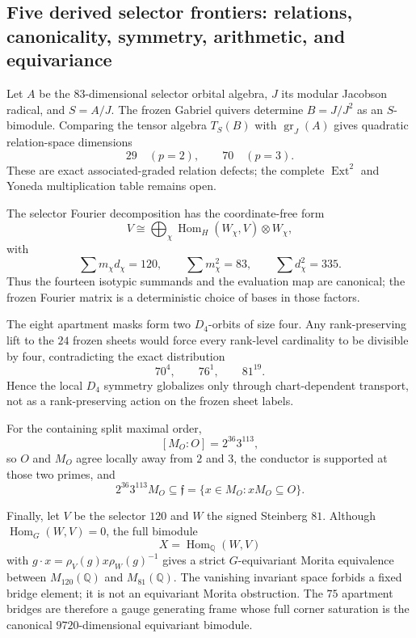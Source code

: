 \subsection{Five derived selector frontiers: relations, canonicality, symmetry, arithmetic, and equivariance}\label{sec:pass1516-1520}
Let $A$ be the $83$-dimensional selector orbital algebra, $J$ its modular Jacobson radical, and $S=A/J$.  The frozen Gabriel quivers determine $B=J/J^2$ as an $S$-bimodule.  Comparing the tensor algebra $T_S(B)$ with $\operatorname{gr}_J(A)$ gives quadratic relation-space dimensions
\[
29\quad (p=2),\qquad 70\quad (p=3).
\]
These are exact associated-graded relation defects; the complete $\operatorname{Ext}^2$ and Yoneda multiplication table remains open.

The selector Fourier decomposition has the coordinate-free form
\[
V\cong\bigoplus_\chi \operatorname{Hom}_H(W_\chi,V)\otimes W_\chi,
\]
with
\[
\sum m_\chi d_\chi=120,\qquad \sum m_\chi^2=83,\qquad \sum d_\chi^2=335.
\]
Thus the fourteen isotypic summands and the evaluation map are canonical; the frozen Fourier matrix is a deterministic choice of bases in those factors.

The eight apartment masks form two $D_4$-orbits of size four.  Any rank-preserving lift to the $24$ frozen sheets would force every rank-level cardinality to be divisible by four, contradicting the exact distribution
\[
70^4,\qquad 76^1,\qquad 81^{19}.
\]
Hence the local $D_4$ symmetry globalizes only through chart-dependent transport, not as a rank-preserving action on the frozen sheet labels.

For the containing split maximal order,
\[
[M_O:O]=2^{36}3^{113},
\]
so $O$ and $M_O$ agree locally away from $2$ and $3$, the conductor is supported at those two primes, and
\[
2^{36}3^{113}M_O\subseteq\mathfrak f=\{x\in M_O:xM_O\subseteq O\}.
\]

Finally, let $V$ be the selector $120$ and $W$ the signed Steinberg $81$.  Although $\operatorname{Hom}_G(W,V)=0$, the full bimodule
\[
X=\operatorname{Hom}_{\mathbb Q}(W,V)
\]
with $g\cdot x=\rho_V(g)x\rho_W(g)^{-1}$ gives a strict $G$-equivariant Morita equivalence between $M_{120}(\mathbb Q)$ and $M_{81}(\mathbb Q)$.  The vanishing invariant space forbids a fixed bridge element; it is not an equivariant Morita obstruction.  The $75$ apartment bridges are therefore a gauge generating frame whose full corner saturation is the canonical $9720$-dimensional equivariant bimodule.
